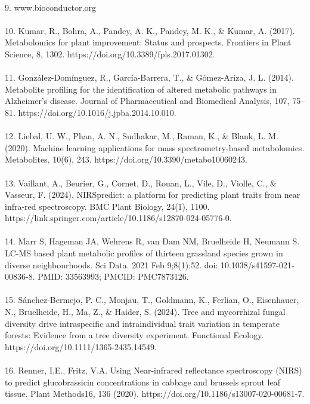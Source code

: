 \documentclass[12pt,a4paper]{report}
\begin{document}
\\
9. www.bioconductor.org \\
\\
10. Kumar, R., Bohra, A., Pandey, A. K., Pandey, M. K., \& Kumar, A. (2017). Metabolomics for plant improvement: Status and prospects. Frontiers in Plant Science, 8, 1302. https://doi.org/10.3389/fpls.2017.01302. \\
\\
11. González-Domínguez, R., García-Barrera, T., \& Gómez-Ariza, J. L. (2014). Metabolite profiling for the identification of altered metabolic pathways in Alzheimer's disease. Journal of Pharmaceutical and Biomedical Analysis, 107, 75–81. https://doi.org/10.1016/j.jpba.2014.10.010. \\
\\
12. Liebal, U. W., Phan, A. N., Sudhakar, M., Raman, K., \& Blank, L. M. (2020). Machine learning applications for mass spectrometry-based metabolomics. Metabolites, 10(6), 243. https://doi.org/10.3390/metabo10060243. \\
\\
13. Vaillant, A., Beurier, G., Cornet, D., Rouan, L., Vile, D., Violle, C., \& Vasseur, F. (2024). NIRSpredict: a platform for predicting plant traits from near infra-red spectroscopy. BMC Plant Biology, 24(1), 1100. https://link.springer.com/article/10.1186/s12870-024-05776-0. \\
\\
14. Marr S, Hageman JA, Wehrens R, van Dam NM, Bruelheide H, Neumann S. LC-MS based plant metabolic profiles of thirteen grassland species grown in diverse neighbourhoods. Sci Data. 2021 Feb 9;8(1):52. doi: 10.1038/s41597-021-00836-8. PMID: 33563993; PMCID: PMC7873126. \\
\\
15. Sánchez-Bermejo, P. C., Monjau, T., Goldmann, K., Ferlian, O., Eisenhauer, N., Bruelheide, H., Ma, Z., \& Haider, S. (2024). Tree and mycorrhizal fungal diversity drive intraspecific and intraindividual trait variation in temperate forests: Evidence from a tree diversity experiment. Functional Ecology. https://doi.org/10.1111/1365-2435.14549. \\
\\
16. Renner, I.E., Fritz, V.A. Using Near-infrared reflectance spectroscopy (NIRS) to predict glucobrassicin concentrations in cabbage and brussels sprout leaf tissue. Plant Methods16, 136 (2020). https://doi.org/10.1186/s13007-020-00681-7. \\
\\
\end{document}
